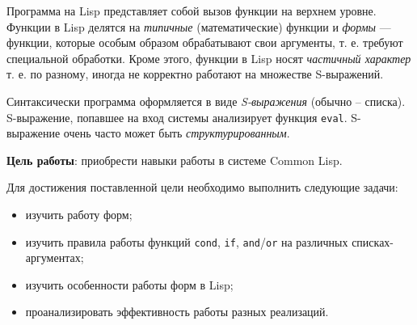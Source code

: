 \Introduction

Программа на Lisp представляет собой вызов функции на верхнем уровне. Функции в
Lisp делятся на \textit{типичные} (математические) функции и \textit{формы} — функции, которые особым
образом обрабатывают свои аргументы, т. е. требуют специальной обработки. Кроме этого,
функции в Lisp носят \textit{частичный характер} т. е. по разному, иногда не корректно работают на
множестве S-выражений.

Синтаксически программа оформляется в виде \textit{S-выражения} (обычно -- списка). S-выражение, попавшее на вход системы анализирует функция \texttt{eval}. S-выражение очень часто
может быть \textit{структурированным}.

\textbf{Цель работы}: приобрести навыки работы в системе Common Lisp.

Для достижения поставленной цели необходимо выполнить следующие задачи:

\begin{itemize}[$\bullet$]
	\item изучить работу форм;
	\item изучить правила работы функций \texttt{cond}, \texttt{if}, \texttt{and}/\texttt{or} на различных списках-аргументах;
	\item изучить особенности работы форм в Lisp;
	\item проанализировать эффективность работы разных реализаций.
\end{itemize}
